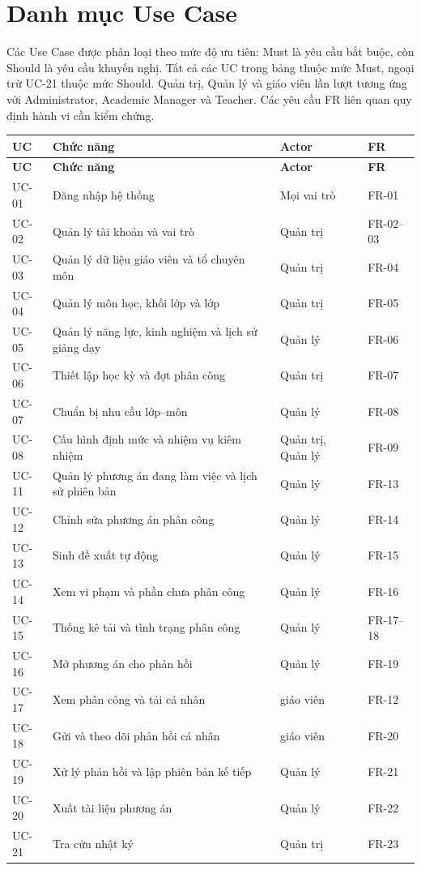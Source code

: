 \documentclass[12pt,a4paper]{report}
\begin{document}
\section{Danh mục Use Case}\label{sec:usecases}
Các Use Case được phân loại theo mức độ ưu tiên: Must là yêu cầu bắt buộc, còn Should là yêu cầu khuyến nghị. Tất cả các UC trong bảng thuộc mức Must, ngoại trừ UC-21 thuộc mức Should. Quản trị, Quản lý và giáo viên lần lượt tương ứng với Administrator, Academic Manager và Teacher. Các yêu cầu FR liên quan quy định hành vi cần kiểm chứng.

\begin{longtable}{|p{1.25cm}|p{6.9cm}|p{2.6cm}|p{2.1cm}|}
\hline
\textbf{UC} & \textbf{Chức năng} & \textbf{Actor} & \textbf{FR} \\\hline
\endfirsthead
\hline
\textbf{UC} & \textbf{Chức năng} & \textbf{Actor} & \textbf{FR} \\\hline
\endhead
UC-01 & Đăng nhập hệ thống & Mọi vai trò & FR-01 \\\hline
UC-02 & Quản lý tài khoản và vai trò & Quản trị & FR-02--03 \\\hline
UC-03 & Quản lý dữ liệu giáo viên và tổ chuyên môn & Quản trị & FR-04 \\\hline
UC-04 & Quản lý môn học, khối lớp và lớp & Quản trị & FR-05 \\\hline
UC-05 & Quản lý năng lực, kinh nghiệm và lịch sử giảng dạy & Quản lý & FR-06 \\\hline
UC-06 & Thiết lập học kỳ và đợt phân công & Quản trị & FR-07 \\\hline
UC-07 & Chuẩn bị nhu cầu lớp--môn & Quản lý & FR-08 \\\hline
UC-08 & Cấu hình định mức và nhiệm vụ kiêm nhiệm & Quản trị, Quản lý & FR-09 \\\hline
UC-11 & Quản lý phương án đang làm việc và lịch sử phiên bản & Quản lý & FR-13 \\\hline
UC-12 & Chỉnh sửa phương án phân công & Quản lý & FR-14 \\\hline
UC-13 & Sinh đề xuất tự động & Quản lý & FR-15 \\\hline
UC-14 & Xem vi phạm và phần chưa phân công & Quản lý & FR-16 \\\hline
UC-15 & Thống kê tải và tình trạng phân công & Quản lý & FR-17--18 \\\hline
UC-16 & Mở phương án cho phản hồi & Quản lý & FR-19 \\\hline
UC-17 & Xem phân công và tải cá nhân & giáo viên & FR-12 \\\hline
UC-18 & Gửi và theo dõi phản hồi cá nhân & giáo viên & FR-20 \\\hline
UC-19 & Xử lý phản hồi và lập phiên bản kế tiếp & Quản lý & FR-21 \\\hline
UC-20 & Xuất tài liệu phương án & Quản lý & FR-22 \\\hline
UC-21 & Tra cứu nhật ký & Quản trị & FR-23 \\\hline
\end{longtable}
\end{document}
